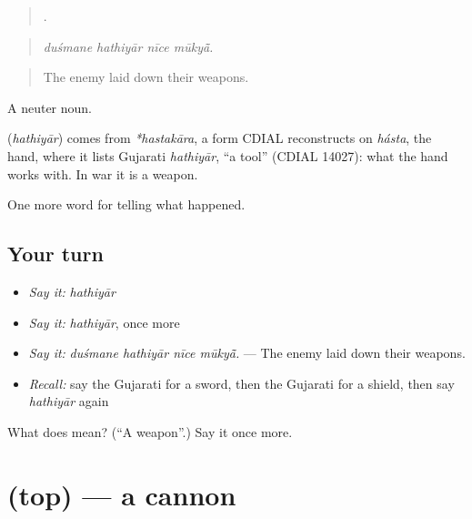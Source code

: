 \begin{quote}
   .
\end{quote}

\begin{quote}
\emph{duśmane hathiyār nīce mūkyā̃.}
\end{quote}

\begin{quote}
The enemy laid down their weapons.
\end{quote}

A neuter noun.

\begin{cousinweb}
\textbf{} (\emph{hathiyār}) comes from \emph{*hastakāra}, a form CDIAL reconstructs on \emph{hásta}, the hand, where it lists Gujarati \emph{hathiyār}, \textquotedblleft{}a tool\textquotedblright{} (CDIAL 14027): what the hand works with. In war it is a weapon.
\end{cousinweb}

\begin{grammarlens}[title={What you've built}]
One more word for telling what happened.
\end{grammarlens}

\subsection*{Your turn}
\begin{itemize}
\raggedright
  \item \emph{Say it:} \emph{hathiyār}
  \item \emph{Say it:} \emph{hathiyār}, once more
  \item \emph{Say it:} \emph{duśmane hathiyār nīce mūkyā̃.} — The enemy laid down their weapons.
  \item \emph{Recall:} say the Gujarati for a sword, then the Gujarati for a shield, then say \emph{hathiyār} again
\end{itemize}

\begin{tcolorbox}[breakable,colback=teal!4,colframe=teal!35!black,title={Before you move on}]
What does  mean? (\textquotedblleft{}A weapon\textquotedblright{}.) Say it once more.
\end{tcolorbox}
\section[\texorpdfstring{\gu{તોપ} (top)}{તોપ (top)}]{ (top) — a cannon}

